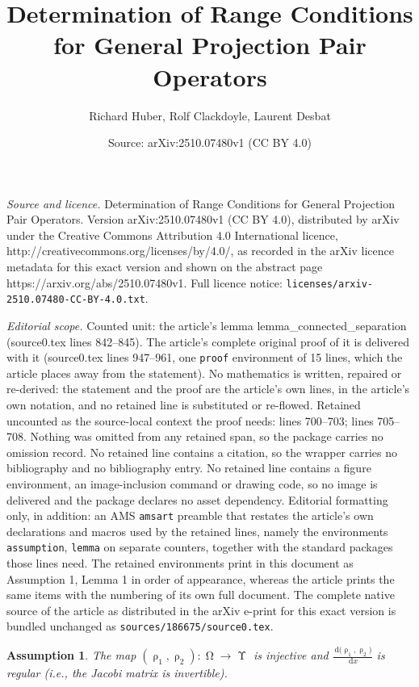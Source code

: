 \documentclass[10pt,a4paper]{amsart}
\title{Determination of Range Conditions for General Projection Pair Operators}
\author{Richard Huber, Rolf Clackdoyle, Laurent Desbat}
\date{Source: arXiv:2510.07480v1 (CC BY 4.0)}
\newtheorem{assumption}{Assumption}
\DeclareMathOperator{\Xgroundset}{\Upsilon}
\newcommand{\dd}[1]{\,\mathrm{d}{#1}}
\DeclareMathOperator{\imgdom}{{\Omega}}
\DeclareMathOperator{\rayinverse}{\rho}
\begin{document}
\maketitle

\noindent\emph{Source and licence.} Determination of Range Conditions for General Projection Pair Operators. Version arXiv:2510.07480v1 (CC BY 4.0), distributed by arXiv under the Creative Commons Attribution 4.0 International licence, http://creativecommons.org/licenses/by/4.0/, as recorded in the arXiv licence metadata for this exact version and shown on the abstract page https://arxiv.org/abs/2510.07480v1. Full licence notice: \texttt{licenses/arxiv-2510.07480-CC-BY-4.0.txt}.\par\smallskip

\noindent\textit{Editorial scope.} Counted unit: the article's lemma lemma\_connected\_separation (source0.tex lines 842--845). The article's complete original proof of it is delivered with it (source0.tex lines 947--961, one \texttt{proof} environment of 15 lines, which the article places away from the statement). No mathematics is written, repaired or re-derived: the statement and the proof are the article's own lines, in the article's own notation, and no retained line is substituted or re-flowed.  Retained uncounted as the source-local context the proof needs: lines 700--703; lines 705--708.  Nothing was omitted from any retained span, so the package carries no omission record.  No retained line contains a citation, so the wrapper carries no bibliography and no bibliography entry.  No retained line contains a figure environment, an image-inclusion command or drawing code, so no image is delivered and the package declares no asset dependency.  Editorial formatting only, in addition: an AMS \texttt{amsart} preamble that restates the article's own declarations and macros used by the retained lines, namely the environments \texttt{assumption}, \texttt{lemma} on separate counters, together with the standard packages those lines need.  The retained environments print in this document as Assumption 1, Lemma 1 in order of appearance, whereas the article prints the same items with the numbering of its own full document.  The complete native source of the article as distributed in the arXiv e-print for this exact version is bundled unchanged as \texttt{sources/186675/source0.tex}.
\begin{assumption}
\label{Assumption_curve_independent}
The map $(\rayinverse_1,\rayinverse_2)\colon \imgdom \to \Xgroundset$ is injective and $\frac{\dd (\rayinverse_1,\rayinverse_2)}{\dd x}$ is regular (i.e., the Jacobi matrix is invertible).
\end{assumption}
\end{document}
